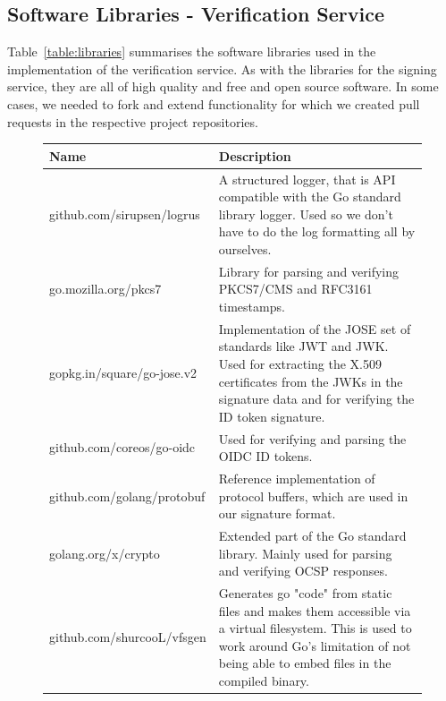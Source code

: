 \subsection{Software Libraries - Verification Service}\label{subsec:software-libraries-verifier}
Table~\ref{table:libraries} summarises the software libraries used in the implementation of the verification service.
As with the libraries for the signing service,
they are all of high quality and free and open source software.
In some cases, we needed to fork and extend functionality for which we created pull requests in the respective project repositories.

\begin{figure}
    \begin{center}
        \begin{tabular}{p{4.2cm}|p{12cm}}
            \textbf{Name} & \textbf{Description} \\ \hline
            github.com/sirupsen/logrus & A structured logger,
            that is API compatible with the Go standard library logger.
            Used so we don't have to do the log formatting all by ourselves. \\
            \hline
            go.mozilla.org/pkcs7 & Library for parsing and verifying \gls{PKCS7}/\gls{CMS} and RFC3161~\cite{rfc3161} timestamps. \\
            \hline
            gopkg.in/square/go-jose.v2 & Implementation of the \gls{JOSE} set of standards like \gls{JWT} and \gls{JWK}.
            Used for extracting the X.509 certificates from the \gls{JWK}s in the signature data and for verifying the ID token signature. \\
            \hline
			github.com/coreos/go-oidc & Used for verifying and parsing the \gls{OIDC} ID tokens. \\
            \hline
            github.com/golang/protobuf & Reference implementation of protocol buffers, which are used in our signature format. \\
            \hline
            golang.org/x/crypto & Extended part of the Go standard library. Mainly used for parsing and verifying \gls{OCSP} responses. \\
            \hline
            github.com/shurcooL/vfsgen & Generates go "code" from static files and makes them accessible via a virtual filesystem. This is used to work around Go's limitation of not being able to embed files in the compiled binary.
        \end{tabular}
    \end{center}
\end{figure}

